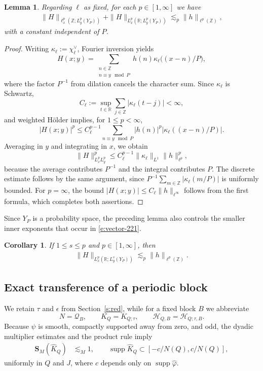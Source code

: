 \documentclass[12pt,leqno]{amsart}
\numberwithin{equation}{section}
\newtheorem{corollary}[equation]{Corollary}
\newtheorem{lemma}[equation]{Lemma}
\theoremstyle{definition}
\theoremstyle{plain}
\begin{document}
	\begin{lemma}\label{l:lift}
		Regarding $\ell$ as fixed, for each $ p \in [1,\infty]$ we have
		\begin{align}
			\|H\|_{\ell^p_x(\mathbb Z;L^p_y(Y_P))}
			+\|H\|_{L^p_x(\mathbb R;L^p_y(Y_P))}
			\lesssim_p\|h\|_{\ell^p(\mathbb Z)},
		\end{align}
		with a constant independent of $P$.
	\end{lemma}
	\begin{proof}
		Writing $\kappa_\ell:=\chi_{\ell}^\vee$, Fourier inversion yields
		\[
		H(x;y)=\sum_{\substack{n\in\mathbb Z\\n\equiv y\mod P}}
		h(n)\kappa_\ell\big((x-n)/P\big),
		\]
		where the factor $P^{-1}$ from dilation cancels the character sum.
		Since $\kappa_\ell$ is Schwartz,
		\[
		C_\ell:=\sup_{t\in\mathbb R}\sum_{j\in\mathbb Z}
		|\kappa_\ell(t-j)|<\infty,
		\]
		and weighted H\"older implies, for $1\leq p<\infty$,
		\[
		|H(x;y)|^p\leq C_\ell^{p-1}
		\sum_{n\equiv y\mod P}|h(n)|^p
		|\kappa_\ell((x-n)/P)|.
		\]
		Averaging in $y$ and integrating in $x$, we obtain
		\[
		\|H\|_{L_x^pL_y^p}^p
		\leq C_\ell^{p-1}\|\kappa_\ell\|_{L^1}\|h\|_{\ell^p}^p,
		\]
		because the average contributes $P^{-1}$ and the integral contributes $P$.
		The discrete estimate follows by the same argument, since
		$P^{-1}\sum_{m\in\mathbb Z}|\kappa_\ell(m/P)|$ is uniformly bounded.
		For $p=\infty$, the bound
		$|H(x;y)|\leq C_\ell\|h\|_{\ell^\infty}$ follows from the first
		formula, which completes both assertions.
	\end{proof}
	
	
	Since $Y_P$ is a probability space, the preceding lemma also controls
	the smaller inner exponents that occur in \eqref{e:vector-221}.
	\begin{corollary}\label{c:lift}
		If $1\leq s\leq p$ and $p \in [1,\infty]$, then
		\begin{align}
			\|H\|_{L^p_x(\mathbb R;L^s_y(Y_P))}
			\lesssim_p\|h\|_{\ell^p(\mathbb Z)}.
		\end{align}
	\end{corollary}
	
	\subsection{Exact transference of a periodic block}
	We retain $\tau$ and $\epsilon$ from Section~\ref{s:red}, while for a
	fixed block $B$ we abbreviate \[ N=\mathcal Q_B, \qquad K_Q=K_{Q;\tau}, \qquad \mathcal H_{Q,B}=\mathcal H_{Q;\tau,B}.\]
	Because $\psi$ is smooth, compactly supported away from zero, and odd,
	the dyadic multiplier estimates and the product rule imply
	\begin{align}\label{e:kernel-BV}
		\mathbf{S}_M(\widehat K_Q)&\lesssim_M1, \qquad \operatorname{supp}\widehat K_Q
		\subset[-c/N(Q),c/N(Q)],
	\end{align}
	uniformly in $Q$ and $J$, where $c$ depends only on
	$\operatorname{supp}\widehat\varphi$.
\end{document}
